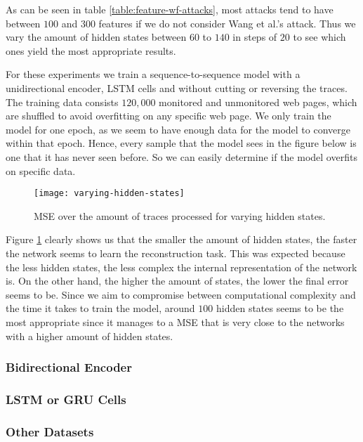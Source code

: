 As can be seen in table \ref{table:feature-wf-attacks}, most attacks tend to have between $100$ and $300$ features if we do not consider Wang et al.'s attack.
Thus we vary the amount of hidden states between $60$ to $140$ in steps of $20$ to see which ones yield the most appropriate results.

For these experiments we train a sequence-to-sequence model with a unidirectional encoder, LSTM cells and without cutting or reversing the traces.
The training data consists $120,000$ monitored and unmonitored web pages, which are shuffled to avoid overfitting on any specific web page.
We only train the model for one epoch, as we seem to have enough data for the model to converge within that epoch.
Hence, every sample that the model sees in the figure below is one that it has never seen before.
So we can easily determine if the model overfits on specific data.

\begin{figure}[ht]
  \centering
  \texttt{[image: varying-hidden-states]}
  \caption{MSE over the amount of traces processed for varying hidden states.}
  \label{fig:varying-hidden-states}
\end{figure}

Figure \ref{fig:varying-hidden-states} clearly shows us that the smaller the amount of hidden states, the faster the network seems to learn the reconstruction task.
This was expected because the less hidden states, the less complex the internal representation of the network is.
On the other hand, the higher the amount of states, the lower the final error seems to be.
Since we aim to compromise between computational complexity and the time it takes to train the model, around $100$ hidden states seems to be the most appropriate since it manages to a MSE that is very close to the networks with a higher amount of hidden states.

\subsubsection{Bidirectional Encoder}


\subsubsection{LSTM or GRU Cells}


\subsubsection{Other Datasets}

